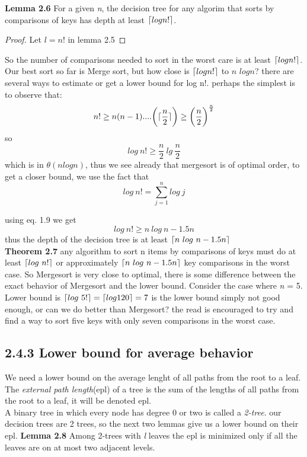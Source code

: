 \documentclass[a4paper,10pt,titlepage]{report}
\DeclarePairedDelimiter{\ceil}{\lceil}{\rceil}
\begin{document}
\vspace{5mm}
\textbf{Lemma 2.6} For a given \textit{n}, the decision tree for any algorim that sorts by comparisons of keys has depth at least $\ceil{log n!}$.
\vspace{5mm}
\begin{proof}
Let $\textit{l} = \textit{n}!$ in lemma 2.5
\end{proof}
\vspace{5mm}
So the number of comparisons needed to sort in the worst care is at least $\ceil{log n!}$. Our best sort so far is Merge sort, but how close is $\ceil{log n!}$ to $\textit{n }log\textit{n}$? there are several ways to estimate or get a lower bound for log n!. perhaps the simplest is to observe that:
\begin{equation}
n! \geq n(n-1)....\bigg(\ceil{\frac{n}{2}}\bigg) \geq \bigg(\frac{n}{2}\bigg)^{\frac{n}{2}}
\end{equation}
so
\begin{equation}
log \ n! \geq \frac{n}{2} \ lg \ \frac{n}{2}
\end{equation}
which is in $\theta(n log n)$, thus we see already that mergesort is of optimal order, to get a closer bound, we use the fact that 
\begin{equation}
log \ n! = \sum_{j=1}^n log \ j
\end{equation}

using eq. 1.9 we get
\begin{equation}
log \ n! \geq n \ log \ n - 1.5n
\end{equation}
thus the depth of the decision tree is at least $\ceil{n \ log \ n - 1.5n}$\\

\vspace{5mm}
\textbf{Theorem 2.7} any algorithm to sort n items by comparisons of keys must do at least $ \ceil{log \ n!}$ or approximately  $\ceil{n \ log \ n - 1.5n}$ key comparisons in the worst case.
\vspace{5mm}
So Mergesort is very close to optimal, there is some difference between the exact behavior of Mergesort and the lower bound. Consider the case where \textit{n} = 5. Lower bound is $\ceil{log \ 5!} = \ceil{log 120} = 7$ is the lower bound simply not good enough, or can we do better than Mergesort? the read is encouraged to try and find a way to sort five keys with only seven comparisons in the worst case.
\subsection{2.4.3 Lower bound for average behavior}
We need a lower bound on the average lenght of all paths from the root to a leaf. The \textit{external path length}(epl) of a tree is the sum of the lengths of all paths from the root to a leaf, it will be denoted epl. \\
A binary tree in which every node has degree 0 or two is called a \textit{2-tree}. our decision trees are 2 trees, so the next two lemmas give us a lower bound on their epl.
\vspace{5mm}
\textbf{Lemma 2.8} Among 2-trees with \textit{l} leaves the epl is minimized only if all the leaves are on at most two adjacent levels.
\end{document}
